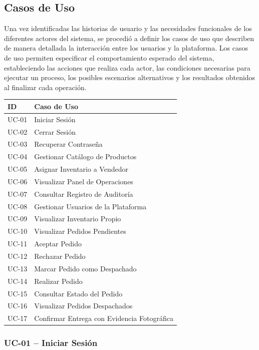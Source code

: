 \documentclass[12pt,a4paper]{report}
\begin{document}
\subsection{Casos de Uso }
Una vez identificadas las historias de usuario y las necesidades funcionales de los diferentes actores del sistema, se procedió a definir los casos de uso que describen de manera detallada la interacción entre los usuarios y la plataforma. Los casos de uso permiten especificar el comportamiento esperado del sistema, estableciendo las acciones que realiza cada actor, las condiciones necesarias para ejecutar un proceso, los posibles escenarios alternativos y los resultados obtenidos al finalizar cada operación.

\begin{longtable}{|p{2cm}|p{12cm}|}
\hline
\textbf{ID} & \textbf{Caso de Uso} \\ \hline
UC-01 & Iniciar Sesión \\ \hline
UC-02 & Cerrar Sesión \\ \hline
UC-03 & Recuperar Contraseña \\ \hline
UC-04 & Gestionar Catálogo de Productos \\ \hline
UC-05 & Asignar Inventario a Vendedor \\ \hline
UC-06 & Visualizar Panel de Operaciones \\ \hline
UC-07 & Consultar Registro de Auditoría \\ \hline
UC-08 & Gestionar Usuarios de la Plataforma \\ \hline
UC-09 & Visualizar Inventario Propio \\ \hline
UC-10 & Visualizar Pedidos Pendientes \\ \hline
UC-11 & Aceptar Pedido \\ \hline
UC-12 & Rechazar Pedido \\ \hline
UC-13 & Marcar Pedido como Despachado \\ \hline
UC-14 & Realizar Pedido \\ \hline
UC-15 & Consultar Estado del Pedido \\ \hline
UC-16 & Visualizar Pedidos Despachados \\ \hline
UC-17 & Confirmar Entrega con Evidencia Fotográfica \\ \hline
\end{longtable}

\subsubsection{UC-01 -- Iniciar Sesión}
\end{document}

